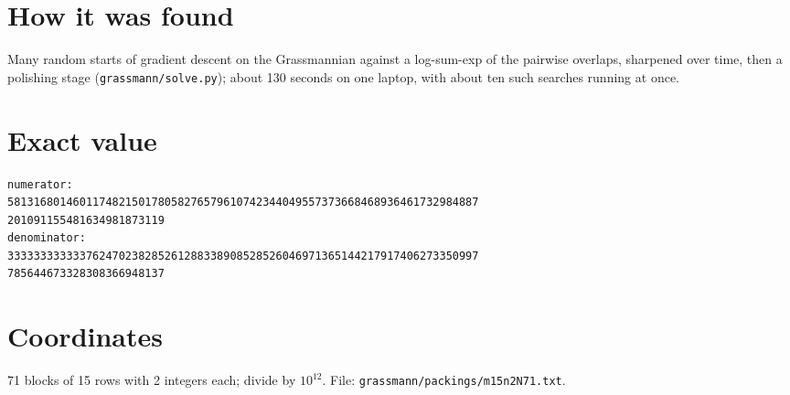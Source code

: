 \documentclass[11pt,a4paper]{article}
\begin{document}
\section{How it was found}
Many random starts of gradient descent on the Grassmannian against a log-sum-exp of the pairwise overlaps, sharpened over time, then a polishing stage (\texttt{grassmann/solve.py}); about 130 seconds on one laptop, with about ten such searches running at once.


\appendix
\section{Exact value}
{\small
\begin{verbatim}
numerator:
581316801460117482150178058276579610742344049557373668468936461732984887
201091155481634981873119
denominator:
333333333333762470238285261288338908528526046971365144217917406273350997
785644673328308366948137
\end{verbatim}}

\section{Coordinates}
71 blocks of 15 rows with 2 integers each; divide by $10^{12}$. File: \texttt{grassmann/packings/m15n2N71.txt}.
{\tiny
\begin{multicols}{4}
\end{multicols}}
\end{document}

